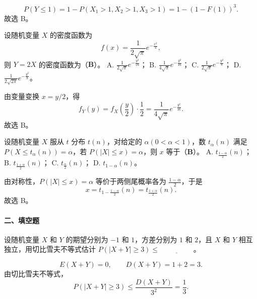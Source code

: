\documentclass[lang=cn,11pt]{elegantbook}
\begin{document}
\begin{solution}
\par
\[
P(Y\le1)=1-P(X_1>1,X_2>1,X_3>1)
=1-(1-F(1))^3.
\]
故选 B。
\end{solution}

\begin{exercise}
\par
设随机变量 \(X\) 的密度函数为
\[
f(x)=\frac{1}{2\sqrt{\pi}}e^{-\frac{x^2}{4}},
\]
则 \(Y=2X\) 的密度函数为（\( \boldsymbol{B} \)）。
A. \(\frac{1}{2\sqrt{\pi}}e^{-\frac{y^2}{16}}\)； 
B. \(\frac{1}{4\sqrt{\pi}}e^{-\frac{y^2}{16}}\)； 
C. \(\frac{1}{2\sqrt{\pi}}e^{-\frac{y^2}{8}}\)； 
D. \(\frac{1}{2\sqrt{2\pi}}e^{-\frac{y^2}{8}}\)。
\end{exercise}

\begin{solution}
\par
由变量变换 \(x=y/2\)，得
\[
f_Y(y)=f_X\!\left(\frac y2\right)\cdot\frac12
=\frac{1}{4\sqrt{\pi}}e^{-\frac{y^2}{16}}.
\]
故选 B。
\end{solution}

\begin{exercise}
\par
设随机变量 \(X\) 服从 \(t\) 分布 \(t(n)\)，对给定的 \(\alpha(0<\alpha<1)\)，数 \(t_\alpha(n)\) 满足 \(P(X\le t_\alpha(n))=\alpha\)，若 \(P(|X|\le x)=\alpha\)，则 \(x\) 等于（\( \boldsymbol{B} \)）。
A. \(t_{\frac{1-\alpha}{2}}(n)\)； B. \(t_{\frac{1+\alpha}{2}}(n)\)； C. \(t_{\frac{\alpha}{2}}(n)\)； D. \(t_{1-\alpha}(n)\)。
\end{exercise}

\begin{solution}
\par
由对称性，\(P(|X|\le x)=\alpha\) 等价于两侧尾概率各为 \(\frac{1-\alpha}{2}\)，于是
\[
x=t_{1-\frac{1-\alpha}{2}}(n)=t_{\frac{1+\alpha}{2}}(n).
\]
故选 B。
\end{solution}

\paragraph*{二、填空题}
\begin{exercise}
\par
设随机变量 \(X\) 和 \(Y\) 的期望分别为 \(-1\) 和 \(1\)，方差分别为 \(1\) 和 \(2\)，且 \(X\) 和 \(Y\) 相互独立，用切比雪夫不等式估计 \(P(|X+Y|\ge3)\le \underline{\hspace{2cm}}\)。
\end{exercise}

\begin{solution}
\par
\[
E(X+Y)=0,\qquad D(X+Y)=1+2=3.
\]
由切比雪夫不等式，
\[
P(|X+Y|\ge3)\le \frac{D(X+Y)}{3^2}=\frac13.
\]
\end{solution}
\end{document}
